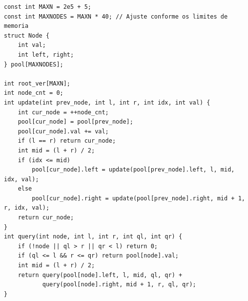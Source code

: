 \begin{lstlisting}
const int MAXN = 2e5 + 5;
const int MAXNODES = MAXN * 40; // Ajuste conforme os limites de memoria
struct Node {
    int val;
    int left, right;
} pool[MAXNODES];

int root_ver[MAXN];
int node_cnt = 0;
int update(int prev_node, int l, int r, int idx, int val) {
    int cur_node = ++node_cnt;
    pool[cur_node] = pool[prev_node];
    pool[cur_node].val += val;
    if (l == r) return cur_node;
    int mid = (l + r) / 2;
    if (idx <= mid)
        pool[cur_node].left = update(pool[prev_node].left, l, mid, idx, val);
    else 
        pool[cur_node].right = update(pool[prev_node].right, mid + 1, r, idx, val);
    return cur_node;
}
int query(int node, int l, int r, int ql, int qr) {
    if (!node || ql > r || qr < l) return 0;
    if (ql <= l && r <= qr) return pool[node].val;
    int mid = (l + r) / 2;
    return query(pool[node].left, l, mid, ql, qr) + 
           query(pool[node].right, mid + 1, r, ql, qr);
}
\end{lstlisting}
